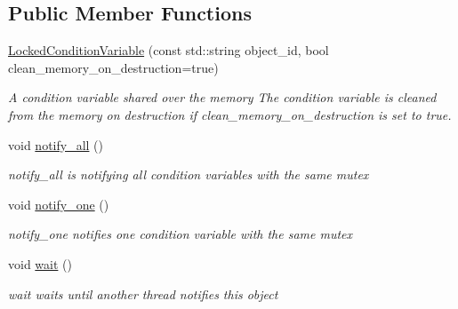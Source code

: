 \subsection*{Public Member Functions}
\begin{DoxyCompactItemize}
\item 
\hyperlink{classshared__memory_1_1LockedConditionVariable_a648057022bbf8a7b5221e1170b1e099c}{Locked\+Condition\+Variable} (const std\+::string object\+\_\+id, bool clean\+\_\+memory\+\_\+on\+\_\+destruction=true)
\begin{DoxyCompactList}\small\item\em A condition variable shared over the memory The condition variable is cleaned from the memory on destruction if clean\+\_\+memory\+\_\+on\+\_\+destruction is set to true. \end{DoxyCompactList}\item 
\mbox{\label{classshared__memory_1_1LockedConditionVariable_a31633f2243b988dc0a8bd3d4637dc216}} 
void \hyperlink{classshared__memory_1_1LockedConditionVariable_a31633f2243b988dc0a8bd3d4637dc216}{notify\+\_\+all} ()
\begin{DoxyCompactList}\small\item\em notify\+\_\+all is notifying all condition variables with the same mutex \end{DoxyCompactList}\item 
\mbox{\label{classshared__memory_1_1LockedConditionVariable_a532a1332fe184e668a49fa002db5be08}} 
void \hyperlink{classshared__memory_1_1LockedConditionVariable_a532a1332fe184e668a49fa002db5be08}{notify\+\_\+one} ()
\begin{DoxyCompactList}\small\item\em notify\+\_\+one notifies one condition variable with the same mutex \end{DoxyCompactList}\item 
\mbox{\label{classshared__memory_1_1LockedConditionVariable_a9eb84ab5d570a0c5a81f6eaeb4c4dd50}} 
void \hyperlink{classshared__memory_1_1LockedConditionVariable_a9eb84ab5d570a0c5a81f6eaeb4c4dd50}{wait} ()
\begin{DoxyCompactList}\small\item\em wait waits until another thread notifies this object \end{DoxyCompactList}\item 

\end{DoxyCompactItemize}
